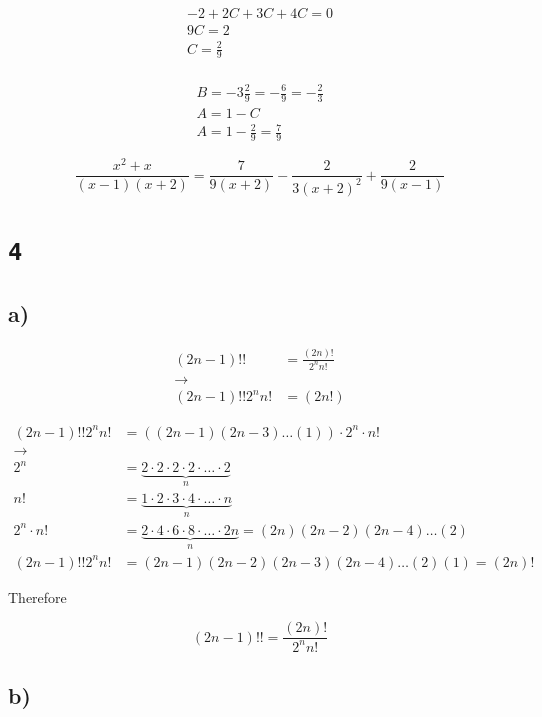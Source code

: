 \documentclass[a4paper,11pt]{report}
\begin{document}
\begin{gather*}
  -2 + 2C + 3C + 4C = 0 \\
  9C = 2 \\
  C = \frac{2}{9}\\
\end{gather*}

\begin{gather*}
  B = -3 \frac{2}{9} = -\frac{6}{9} = - \frac{2}{3}\\
  A = 1 - C \\
  A = 1 - \frac{2}{9} = \frac{7}{9}
\end{gather*}

\[
  \frac{x^2 + x}{(x-1)(x+2)} = \frac{7}{9(x+2)} - \frac{2}{3(x+2)^2} + \frac{2}{9(x-1)}
\]

\section*{\texttt{4}}

\subsection*{a)}

\begin{align*}
  (2n - 1)!! &= \frac{(2n)!}{2^nn!} \\
  \longrightarrow \\
  (2n - 1)!! 2^n n! &= (2n!)
\end{align*}

\begin{align*}
  (2n-1) !! 2^n n! &= \left((2n-1)(2n-3)\dots(1)\right) \cdot 2^n \cdot n! \\
  \longrightarrow \\
  2^n &= \underbrace{2 \cdot 2 \cdot 2 \cdot 2 \cdot \dots \cdot 2}_{n} \\
  n! &= \underbrace{1 \cdot 2 \cdot 3 \cdot 4  \cdot \dots \cdot n}_{n} \\
  2^n \cdot n! &= \underbrace{2 \cdot 4 \cdot 6 \cdot 8 \cdot \dots \cdot 2n}_{n} = (2n)(2n-2)(2n-4)\dots(2) \\
  (2n-1) !! 2^n n! &= (2n-1)(2n-2)(2n-3)(2n-4)\dots(2)(1) = (2n)!
\end{align*}

Therefore

\[
  (2n - 1)!! = \frac{(2n)!}{2^nn!} 
\]

\subsection*{b)}
\end{document}
